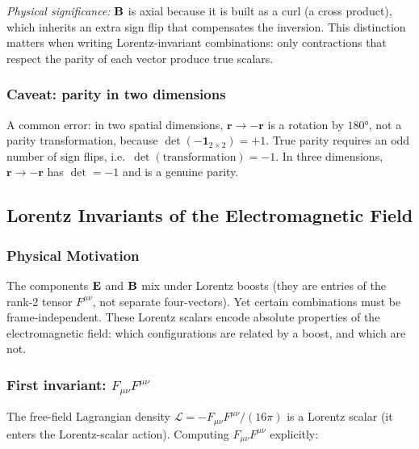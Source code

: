 \textit{Physical significance:} $\mathbf{B}$ is axial because it is built as a curl (a cross product), which
inherits an extra sign flip that compensates the inversion.  This distinction matters when writing
Lorentz-invariant combinations: only contractions that respect the parity of each vector produce true
scalars.

\subsubsection*{Caveat: parity in two dimensions}

A common error: in two spatial dimensions, $\mathbf{r}\to-\mathbf{r}$ is a rotation by $180°$, not a
parity transformation, because $\det(-\mathbf{1}_{2\times 2})=+1$.  True parity requires an odd number
of sign flips, i.e.\ $\det(\text{transformation})=-1$.  In three dimensions, $\mathbf{r}\to-\mathbf{r}$
has $\det=-1$ and is a genuine parity.

\subsection{Lorentz Invariants of the Electromagnetic Field}\label{subsec:lec10-invariants}

\subsubsection*{Physical Motivation}
The components $\mathbf{E}$ and $\mathbf{B}$ mix under Lorentz boosts (they are entries of the rank-2 tensor
$F^{\mu\nu}$, not separate four-vectors).  Yet certain combinations must be frame-independent.  These
Lorentz scalars encode absolute properties of the electromagnetic field: which configurations are
related by a boost, and which are not.

\subsubsection*{First invariant: $F_{\mu\nu}F^{\mu\nu}$}

The free-field Lagrangian density $\mathcal{L}=-F_{\mu\nu}F^{\mu\nu}/(16\pi)$ is a Lorentz scalar
(it enters the Lorentz-scalar action).  Computing $F_{\mu\nu}F^{\mu\nu}$ explicitly:

